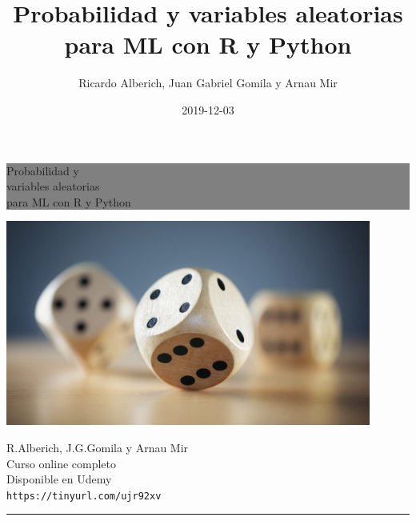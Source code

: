 \documentclass[]{book}
\title{Probabilidad y variables aleatorias para ML con R y Python}
\author{Ricardo Alberich, Juan Gabriel Gomila y Arnau Mir}
\date{2019-12-03}
\begin{document}
\maketitle

\begin{titlepage} %


	\colorbox{grey}{
		\parbox[t]{0.93\textwidth}{ %
			\parbox[t]{0.91\textwidth}{ %
				\raggedleft %
				\fontsize{30pt}{50pt}\selectfont %
				\vspace{0.7cm} %

				Probabilidad y \\
				variables aleatorias \\
				para ML con R y Python\\

				\vspace{0.7cm} %
			}
		}
	}
    \centering

    \includegraphics[width=12cm]{Images/cover.jpg} %


	\vfill %


	\parbox[t]{0.93\textwidth}{ %
		\raggedleft %
		\large %
		{\Large R.Alberich, J.G.Gomila y Arnau Mir}\\[4pt] %
		Curso online completo\\
		Disponible en Udemy\\[4pt] %
		\texttt{https://tinyurl.com/ujr92xv}\\

		\hfill\rule{0.2\linewidth}{1pt}%
	}

\end{titlepage}
\end{document}
